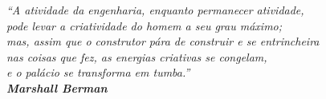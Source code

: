 




\pretextualchapter{}

\vspace{17.5cm}
\begin{flushright}

\textit{``A atividade da engenharia, enquanto permanecer atividade, \\
	 pode levar a criatividade do homem a seu grau máximo; \\
	 mas, assim que o construtor pára de construir e se entrincheira \\
	 nas coisas que fez, as energias criativas se congelam, \\
	 e o palácio se transforma em tumba.'' \\ 
	\bfseries Marshall Berman}

\end{flushright}


